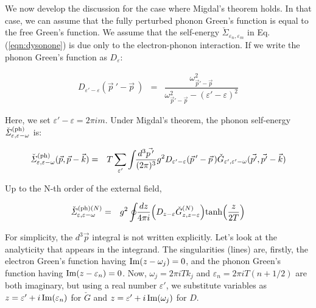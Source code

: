 \documentclass[uplatex,a4j,12pt,dvipdfmx]{jsarticle}
\begin{document}
We now develop the discussion for the case where Migdal's theorem holds.
In that case, we can assume that the fully perturbed phonon Green's function is equal to the free Green's function.
We assume that the self-energy $\check{\mathit{\Sigma}}_{\varepsilon_{n},\varepsilon_{m}}$ in Eq. (\ref{eqn:dysonone}) is due only to the electron-phonon interaction.
If we write the phonon Green's function as $D_{\varepsilon}$:

\begin{eqnarray}
	D_{\varepsilon' - \varepsilon} ( \vec{p} {\ \!}' - \vec{p} {\ \!} )
	&=&
	\dfrac{ \omega^{2}_{ \vec{p}' - \vec{p} } }{ \omega^{2}_{ \vec{p}' - \vec{p} } - ( \varepsilon' - \varepsilon )^{2} }
\end{eqnarray}

Here, we set $\varepsilon' - \varepsilon=2 \pi i m$.
Under Migdal's theorem, the phonon self-energy $\check{\mathit{\Sigma}}^{(\rm ph)}_{\varepsilon , \varepsilon - \omega}$ is:

\begin{eqnarray}
	\check{\mathit{\Sigma}}^{(\rm ph)}_{\varepsilon , \varepsilon - \omega} (\vec{p} , \vec{p} - \vec{k})
	&=&
	T
	\sum_{\varepsilon'}
	\int \!\! \dfrac{ d^{3} \vec{p {} \ \! '} }{ (2 \pi)^{3} }
	g^{2}
	D_{\varepsilon' - \varepsilon} ( \vec{p} {\ \!}' - \vec{p} {\ \!} )
	\check{G}_{\varepsilon' , \varepsilon' - \omega} (\vec{p {} '} , \vec{p {} '} - \vec{k})
\end{eqnarray}

Up to the N-th order of the external field,

\begin{eqnarray}
	\check{\mathit{\Sigma}}^{({\rm ph})(N)}_{\varepsilon , \varepsilon - \omega}
	&=&
	g^{2} \oint \!\! \dfrac{d z}{4 \pi i}
	\Big( D_{z - \varepsilon} \check{G}_{z,z-\varepsilon}^{(N)} \Big)
	{\rm tanh} \Big( \dfrac{z}{2T} \Big)
\end{eqnarray}

For simplicity, the $d^{3} \vec{p}$ integral is not written explicitly.
Let's look at the analyticity that appears in the integrand.
The singularities (lines) are, firstly, the electron Green's function having ${\rm Im}(z - \omega_{j})=0$, and the phonon Green's function having ${\rm Im}(z - \varepsilon_{n})=0$.
Now, $\omega_{j} = 2 \pi i T k_{j}$ and $\varepsilon_{n} = 2 \pi i T (n + 1/2)$ are both imaginary, but using a real number $\varepsilon'$, we substitute variables as $z= \varepsilon' + i \ \! {\rm Im} (\varepsilon_{n})$ for $\check{G}$ and $z= \varepsilon' + i \ \! {\rm Im} (\omega_{j})$ for $D$.
\end{document}
